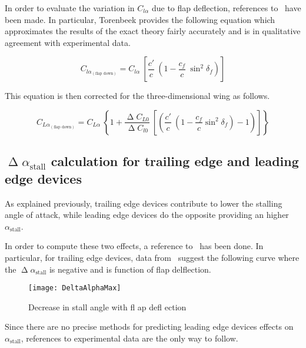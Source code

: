 \noindent
In order to evaluate the variation in $C_{l\alpha}$ due to flap deflection, references to~\cite{torenbeek1982synthesis} have been made. In particular, Torenbeek provides the following equation which approximates the results of the exact theory fairly accurately and is in qualitative agreement with experimental data. 

\begin{equation}
C_{l\alpha_{\left(\text{flap down}\right)}}=C_{l\alpha}\ \left[\dfrac{c'}{c}\ \left(1-\dfrac{c_f}{c}\ \sin^2\delta_f\right)\right]
\label{eqn:ClalphaFlap}
\end{equation}

\noindent
This equation is then corrected for the three-dimensional wing as follows.

\begin{equation}
C_{L\alpha_{\left(\text{flap down}\right)}}=C_{L\alpha}\ \left\{1+\dfrac{\upDelta C_{L0}}{\upDelta C_{l0}}\ \left[\left(\dfrac{c'}{c}\ \left(1-\dfrac{c_f}{c}\sin^2\delta_f\right)-1\right)\right]\right\}
\label{eqn:ClalphaFlap}
\end{equation}

\subsection{$\upDelta\alpha_{\text{stall}}$ calculation for trailing edge and leading edge devices}
As explained previously, trailing edge devices contribute to lower the stalling angle of attack, while leading edge devices do the opposite providing an higher $\alpha_{\text{stall}}$. 

In order to compute these two effects, a reference to~\cite{nicolai2010fundamentals} has been done. In particular, for trailing edge devices, data from~\cite{abbott} suggest the following curve where the $\upDelta\alpha_{\text{stall}}$ is negative and is function of flap delflection.

\begin{figure}[H]
  \centering
  \texttt{[image: DeltaAlphaMax]}
  \caption{Decrease in stall angle with fl ap defl ection}
  \label{fig:DeltaAlphaMaxFlap}
\end{figure}

\noindent
Since there are no precise methods for predicting leading edge devices effects on $\alpha_{\text{stall}}$, references to experimental data are the only way to follow. 

